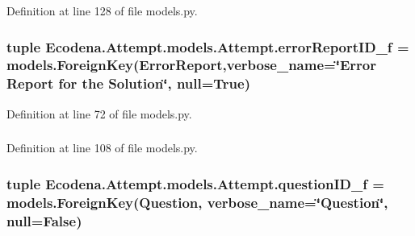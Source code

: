 Definition at line 128 of file models.py.

\hypertarget{class_ecodena_1_1_attempt_1_1models_1_1_attempt_ae2cd37972f3706554532bf2e958c5b7d}{
\subsubsection[{errorReportID\_\-f}]{\setlength{\rightskip}{0pt plus 5cm}tuple {\bf Ecodena.Attempt.models.Attempt.errorReportID\_\-f} = models.ForeignKey({\bf ErrorReport},verbose\_\-name=\char`\"{}Error Report for the Solution\char`\"{}, null=True)}}
\label{d5/da0/class_ecodena_1_1_attempt_1_1models_1_1_attempt_ae2cd37972f3706554532bf2e958c5b7d}


Definition at line 72 of file models.py.

\hypertarget{class_ecodena_1_1_attempt_1_1models_1_1_attempt_ac1e3f9e2d93bbdd1d339f9331a560926}{
\subsubsection[{errorReportID\_\-f}]{}}
\label{d5/da0/class_ecodena_1_1_attempt_1_1models_1_1_attempt_ac1e3f9e2d93bbdd1d339f9331a560926}


Definition at line 108 of file models.py.

\hypertarget{class_ecodena_1_1_attempt_1_1models_1_1_attempt_acbd8a4ec39ee2520f9540c23bf78982b}{
\subsubsection[{questionID\_\-f}]{\setlength{\rightskip}{0pt plus 5cm}tuple {\bf Ecodena.Attempt.models.Attempt.questionID\_\-f} = models.ForeignKey({\bf Question}, verbose\_\-name=\char`\"{}Question\char`\"{}, null=False)}}
\label{d5/da0/class_ecodena_1_1_attempt_1_1models_1_1_attempt_acbd8a4ec39ee2520f9540c23bf78982b}


